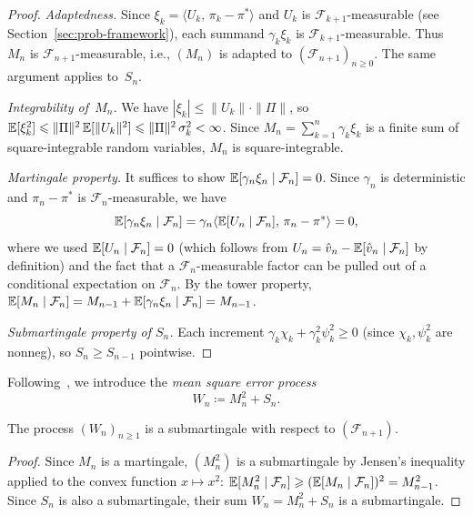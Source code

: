 \documentclass[a4paper,oneside,11pt]{report}
\newcommand{\calF}{\mathcal{F}}
\newcommand{\ip}[2]{\langle #1,\, #2 \rangle}
\newcommand{\norm}[1]{\| #1 \|}
\numberwithin{theorem}{chapter}
\numberwithin{equation}{chapter}
\begin{document}
\begin{proof}
  \emph{Adaptedness.}  Since $\xi_k = \ip{U_k}{\pi_k - \pi^*}$ and
  $U_k$ is $\calF_{k+1}$-measurable (see Section~\ref{sec:prob-framework}),
  each summand $\gamma_k \xi_k$ is $\calF_{k+1}$-measurable. Thus $M_n$
  is $\calF_{n+1}$-measurable, i.e., $(M_n)$ is adapted to
  $(\calF_{n+1})_{n \ge 0}$. The same argument applies to~$S_n$.

  \emph{Integrability of~$M_n$.}  We have
  $|\xi_k| \le \norm{U_k} \cdot \norm{\Pi}$, so
  $\E[\xi_k^2] \le \norm{\Pi}^2\, \E[\norm{U_k}^2]
  \le \norm{\Pi}^2\, \sigma_k^2 < \infty$. Since
  $M_n = \sum_{k=1}^n \gamma_k \xi_k$ is a finite sum of
  square-integrable random variables, $M_n$ is square-integrable.

  \emph{Martingale property.}
  It suffices to show $\E[\gamma_n \xi_n \mid \calF_n] = 0$. Since
  $\gamma_n$ is deterministic and $\pi_n - \pi^*$ is
  $\calF_n$-measurable, we have
  \begin{equation}
    \E[\gamma_n \xi_n \mid \calF_n]
    = \gamma_n \ip{\E[U_n \mid \calF_n]}{\pi_n - \pi^*} = 0,
    \label{eq:mart-check}
  \end{equation}
  where we used $\E[U_n \mid \calF_n] = 0$ (which follows from
  $U_n = \hat v_n - \E[\hat v_n \mid \calF_n]$ by definition) and the
  fact that a $\calF_n$-measurable factor can be pulled out of a
  conditional expectation on $\calF_n$. By the tower property,
  $\E[M_n \mid \calF_n] = M_{n-1} + \E[\gamma_n\xi_n \mid \calF_n] = M_{n-1}$.

  \emph{Submartingale property of $S_n$.}  Each increment
  $\gamma_k \chi_k + \gamma_k^2 \psi_k^2 \ge 0$ (since $\chi_k, \psi_k^2$
  are nonneg), so $S_n \ge S_{n-1}$ pointwise.
\end{proof}

Following~\cite{hsieh2021,giannou2022}, we introduce the \emph{mean
  square error process}
\begin{equation}
  \label{eq:W-def}
  W_n \coloneqq M_n^2 + S_n.
\end{equation}

\begin{lemma}
  \label{lem:W-submart}
  The process $(W_n)_{n \ge 1}$ is a submartingale with respect to
  $(\calF_{n+1})$.
\end{lemma}

\begin{proof}
  Since $M_n$ is a martingale, $(M_n^2)$ is a submartingale by Jensen's
  inequality applied to the convex function $x \mapsto x^2$:
  $\E[M_n^2 \mid \calF_n] \ge (\E[M_n \mid \calF_n])^2 = M_{n-1}^2$.
  Since $S_n$ is also a submartingale, their sum $W_n = M_n^2 + S_n$ is
  a submartingale.
\end{proof}
\end{document}
